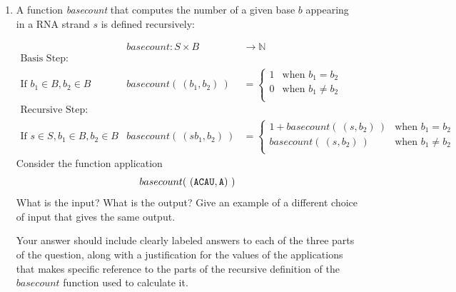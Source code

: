 \begin{enumerate}[labelindent=0pt, leftmargin=0pt]
\begin{enumerate}
\item  A function \textit{basecount} that computes the number of a given base 
$b$ appearing in a RNA strand $s$ is defined recursively:
    
\[
\begin{array}{llll}
& \textit{basecount} : S \times B & \to \mathbb{N} &\\
\textrm{Basis Step:} &  \\
\textrm{If } b_1 \in B, b_2 \in B & \textit{basecount}(~(b_1, b_2)~) & = 
        \begin{cases}
            1 & \textrm{when } b_1 = b_2 \\
            0 & \textrm{when } b_1 \neq b_2 \\
        \end{cases}& \\
\textrm{Recursive Step:} & \\
\textrm{If } s \in S, b_1 \in B, b_2 \in B &\textit{basecount}(~(s b_1, b_2)~) & =
        \begin{cases}
            1 + \textit{basecount}(~(s, b_2)~) & \textrm{when } b_1 = b_2 \\
            \textit{basecount}(~(s, b_2)~) & \textrm{when } b_1 \neq b_2 \\
        \end{cases} &
\end{array}
\]
Consider the function application 
\[
  basecount( ~(\texttt{A}\texttt{C}\texttt{A}\texttt{U}, \texttt{A})~)
\]
What is the input?  What is the output? Give an example of a different choice of input that 
gives the same output.

Your answer should include clearly labeled answers to each of the three parts of the question, 
along with a justification for the values of the applications that makes specific reference to 
the parts of the recursive definition of the $basecount$ function used to calculate it.
\end{enumerate}
\end{enumerate}
